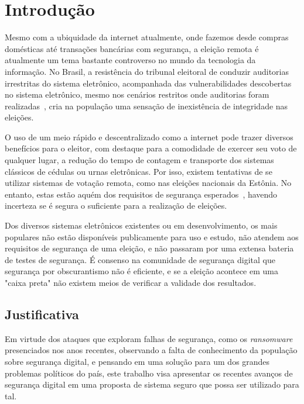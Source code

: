 

\chapter{Introdução}

Mesmo com a ubiquidade da internet atualmente, onde fazemos desde compras
domésticas até transações bancárias com segurança, a eleição remota é
atualmente um tema bastante controverso no mundo da tecnologia da informação.
No Brasil, a resistência do tribunal eleitoral de conduzir auditorias
irrestritas do sistema eletrônico, acompanhada das vulnerabilidades descobertas
no sistema eletrônico, mesmo nos cenários restritos onde auditorias foram
realizadas~\cite{aranha2012vulnerabilidades}, cria na população uma sensação de
inexistência de integridade nas eleições.

O uso de um meio rápido e descentralizado como a internet pode trazer diversos
benefícios para o eleitor, com destaque para a comodidade de exercer seu voto
de qualquer lugar, a redução do tempo de contagem e transporte dos sistemas
clássicos de cédulas ou urnas eletrônicas. Por isso, existem tentativas de se
utilizar sistemas de votação remota, como nas eleições nacionais da Estônia. No
entanto, estas estão aquém dos requisitos de segurança
esperados~\cite{Springall:2014:SAE:2660267.2660315}, havendo incerteza se é
segura o suficiente para a realização de eleições.

Dos diversos sistemas eletrônicos existentes ou em desenvolvimento, os mais
populares não estão disponíveis publicamente para uso e estudo, não atendem aos
requisitos de segurança de uma eleição, e não passaram por uma extensa bateria
de testes de segurança. É consenso na comunidade de segurança digital que
segurança por obscurantismo não é eficiente, e se a eleição acontece em uma
"caixa preta" não existem meios de verificar a validade dos resultados.

\section{Justificativa}

Em virtude dos ataques que exploram falhas de segurança, como os
\textit{ransomware} presenciados nos anos recentes, observando a falta de
conhecimento da população sobre segurança digital, e pensando em uma solução
para um dos grandes problemas políticos do país, este trabalho visa apresentar
os recentes avanços de segurança digital em uma proposta de sistema seguro que
possa ser utilizado para tal.

